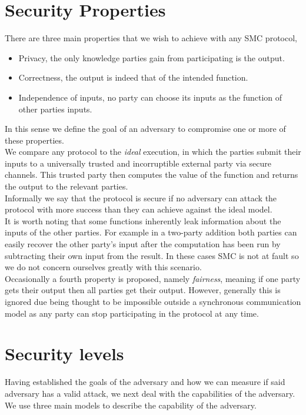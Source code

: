 \documentclass[ %
                    author={Nicholas Tutte},
                supervisor={Prof. Nigel Smart},
                    degree={MEng},
                     title={Secure Two Party Computation},
                  subtitle={A practical comparison of recent protocols},
                      type={Research - GG1K},
                      year={2015} ]{dissertation}
\begin{document}
		\section{Security Properties} \label{sub:SecurityProperties}
			There are three main properties that we wish to achieve with any SMC protocol,
			\begin{itemize}
				\item Privacy, the only knowledge parties gain from participating is the output.
				\item Correctness, the output is indeed that of the intended function.
				\item Independence of inputs, no party can choose its inputs as the function of other parties inputs.
			\end{itemize}

			In this sense we define the goal of an adversary to compromise one or more of these properties.\\

			We compare any protocol to the \emph{ideal} execution, in which the parties submit their inputs to a universally trusted and incorruptible external party via secure channels. This trusted party then computes the value of the function and returns the output to the relevant parties.\\

			Informally we say that the protocol is secure if no adversary can attack the protocol with more success than they can achieve against the ideal model.\\

			It is worth noting that some functions inherently leak information about the inputs of the other parties. For example in a two-party addition both parties can easily recover the other party's input after the computation has been run by subtracting their own input from the result. In these cases SMC is not at fault so we do not concern ourselves greatly with this scenario.\\

			Occasionally a fourth property is proposed, namely \emph{fairness}, meaning if one party gets their output then all parties get their output. However, generally this is ignored due being thought to be impossible outside a synchronous communication model as any party can stop participating in the protocol at any time.

		\section{Security levels}\label{sub:SecurityLevels}
			Having established the goals of the adversary and how we can measure if said adversary has a valid attack, we next deal with the capabilities of the adversary. We use three main models to describe the capability of the adversary.
\end{document}
